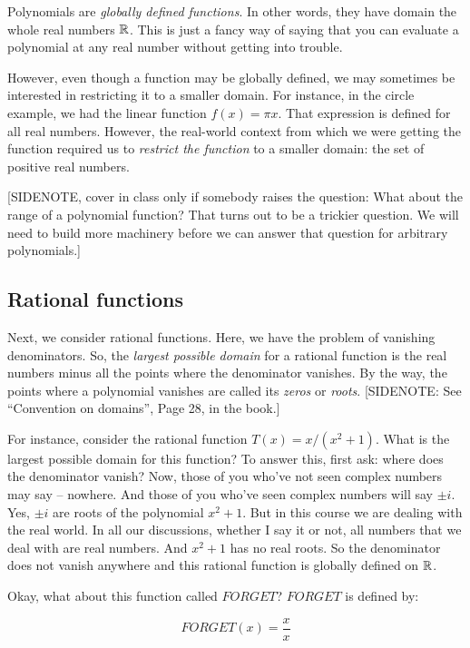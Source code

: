 \documentclass{amsart}
\begin{document}
Polynomials are {\em globally defined functions}. In other
words, they have domain the whole real numbers $\mathbb{R}$. This is just a
fancy way of saying that you can evaluate a polynomial at any real
number without getting into trouble.

However, even though a function may be globally defined, we may
sometimes be interested in restricting it to a smaller domain. For
instance, in the circle example, we had the linear function $f(x) =
\pi x$. That expression is defined for all real numbers. However, the
real-world context from which we were getting the function required us
to {\em restrict the function} to a smaller domain: the set of
positive real numbers.

[SIDENOTE, cover in class only if somebody raises the question: What
about the range of a polynomial function? That turns out to be a
trickier question. We will need to build more machinery before we can
answer that question for arbitrary polynomials.]

\subsection{Rational functions}

Next, we consider rational functions. Here, we have the problem of
vanishing denominators. So, the {\em largest possible domain} for a
rational function is the real numbers minus all the points where the
denominator vanishes. By the way, the points where a polynomial
vanishes are called its {\em zeros} or {\em roots}. [SIDENOTE: See
``Convention on domains'', Page 28, in the book.]

For instance, consider the rational function $T(x) = x/(x^2 +
1)$. What is the largest possible domain for this function? To answer
this, first ask: where does the denominator vanish? Now, those of you
who've not seen complex numbers may say -- nowhere. And those of you
who've seen complex numbers will say $\pm i$. Yes, $\pm i$ are roots
of the polynomial $x^2 + 1$. But in this course we are dealing with
the real world. In all our discussions, whether I say it or not, all
numbers that we deal with are real numbers. And $x^2 + 1$ has no real
roots. So the denominator does not vanish anywhere and this rational
function is globally defined on $\mathbb{R}$.

Okay, what about this function called $FORGET$? $FORGET$ is defined by:

\begin{equation*}
  FORGET(x) = \frac{x}{x}
\end{equation*}
\end{document}
